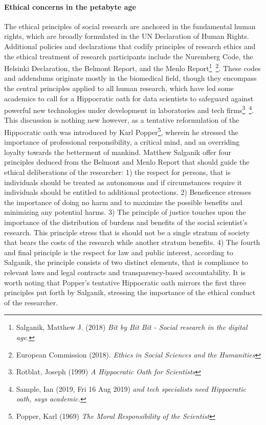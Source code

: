 \documentclass[12pt,a4paper]{article}
\begin{document}
\paragraph{Ethical concerns in the petabyte age\newline}
The ethical principles of social research are anchored in the fundamental human rights, which are broadly formulated in the UN Declaration of Human Rights. Additional policies and declarations that codify principles of research ethics and the ethical treatment of research participants include the Nuremberg Code, the Helsinki Declaration, the Belmont Report, and the Menlo Report\footnote{Salganik, Matthew J. (2018) \textit{Bit by Bit Bit - Social research in the digital age.}}\, \footnote{European Commission (2018). \textit{Ethics in Social Sciences and the Humanities}}. These codes and addendums originate mostly in the biomedical field, though they encompass the central principles applied to all human research, which have led some academics to call for a Hippocratic oath for data scientists to safeguard against powerful new technologies under development in laboratories and tech firms\footnote{Rotblat, Joseph (1999) \textit{A Hippocratic Oath for Scientists}}\, \footnote{Sample, Ian (2019, Fri 16 Aug 2019) \textit{and tech specialists need Hippocratic oath, says academic.}}. This discussion is nothing new however, as a tentative reformulation of the Hippocratic oath was introduced by Karl Popper\footnote{Popper, Karl (1969) \textit{The Moral Responsibility of the Scientist}}, wherein he stressed the importance of professional responsibility, a critical mind, and an overriding loyalty towards the betterment of mankind.\newline
Matthew Salganik offer four principles deduced from the Belmont and Menlo Report that should guide the ethical deliberations of the researcher: 1) the respect for persons, that is individuals should be treated as autonomous and if circumstances require it individuals should be entitled to additional protections. 2) Beneficence stresses the importance of doing no harm and to maximize the possible benefits and minimizing any potential harms. 3) The principle of justice touches upon the importance of the distribution of burdens and benefits of the social scientist's research. This principle stress that is should not be a single stratum of society that bears the costs of the research while another stratum benefits. 4) The fourth and final principle is the respect for law and public interest, according to Salganik, the principle consists of two distinct elements, that is compliance to relevant laws and legal contracts and transparency-based accountability. It is worth noting that Popper’s tentative Hippocratic oath mirrors the first three principles put forth by Salganik, stressing the importance of the ethical conduct of the researcher.\newline
\end{document}

